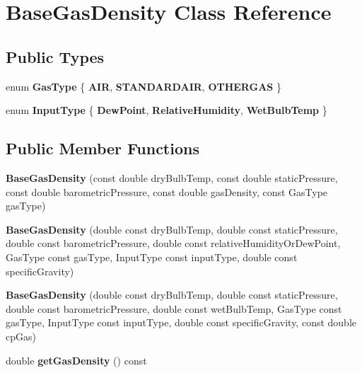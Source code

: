 \hypertarget{class_base_gas_density}{}\section{Base\+Gas\+Density Class Reference}
\label{class_base_gas_density}
\subsection*{Public Types}
\begin{DoxyCompactItemize}
\item 
\mbox{\label{class_base_gas_density_afb215e48f6193462521b7e8d47306ed3}} 
enum {\bfseries Gas\+Type} \{ {\bfseries A\+IR}, 
{\bfseries S\+T\+A\+N\+D\+A\+R\+D\+A\+IR}, 
{\bfseries O\+T\+H\+E\+R\+G\+AS}
 \}
\item 
\mbox{\label{class_base_gas_density_a54f846cc4683a49d3904a40fe2986772}} 
enum {\bfseries Input\+Type} \{ {\bfseries Dew\+Point}, 
{\bfseries Relative\+Humidity}, 
{\bfseries Wet\+Bulb\+Temp}
 \}
\end{DoxyCompactItemize}
\subsection*{Public Member Functions}
\begin{DoxyCompactItemize}
\item 
\mbox{\label{class_base_gas_density_a84089ddd9d29649d83a7b150b711b989}} 
{\bfseries Base\+Gas\+Density} (const double dry\+Bulb\+Temp, const double static\+Pressure, const double barometric\+Pressure, const double gas\+Density, const Gas\+Type gas\+Type)
\item 
\mbox{\label{class_base_gas_density_a0d53c40eecc4aad87c8fef1cfed1b614}} 
{\bfseries Base\+Gas\+Density} (double const dry\+Bulb\+Temp, double const static\+Pressure, double const barometric\+Pressure, double const relative\+Humidity\+Or\+Dew\+Point, Gas\+Type const gas\+Type, Input\+Type const input\+Type, double const specific\+Gravity)
\item 
\mbox{\label{class_base_gas_density_a08fc6e441bfec806ea73a9e37be60d92}} 
{\bfseries Base\+Gas\+Density} (double const dry\+Bulb\+Temp, double const static\+Pressure, double const barometric\+Pressure, double const wet\+Bulb\+Temp, Gas\+Type const gas\+Type, Input\+Type const input\+Type, double const specific\+Gravity, const double cp\+Gas)
\item 
\mbox{\label{class_base_gas_density_a1cbf2591aecb384afd5843f0e4a62a4e}} 
double {\bfseries get\+Gas\+Density} () const
\end{DoxyCompactItemize}

